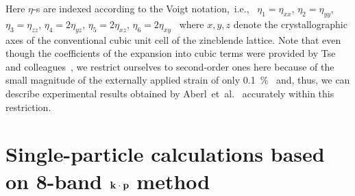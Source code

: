 %
%
Here $\eta$-s are indexed according to the Voigt notation,~i.e.,~ $\eta_1=\eta_{xx}$, $\eta_2=\eta_{yy}$, $\eta_3=\eta_{zz}$, $\eta_4=2\eta_{yz}$, $\eta_5=2\eta_{xz}$, $\eta_6=2\eta_{xy}$~\cite{Beya-Wakata2011} where $x,y,z$ denote the crystallographic axes of the conventional cubic unit cell of the zincblende lattice.
%
%
Note that even though the coefficients of the expansion into cubic
terms were provided by Tse and colleagues~\cite{Tse2013}, we restrict ourselves to second-order ones here because of the small magnitude of the externally applied strain of only 0.1~\%~\cite{Aberl:17} and, thus, we can describe experimental results obtained by Aberl~et~al.~\cite{Aberl:17} accurately within this restriction. 


\section{Single-particle calculations based on 8-band $\bf{k \cdot p}$ method}




%


